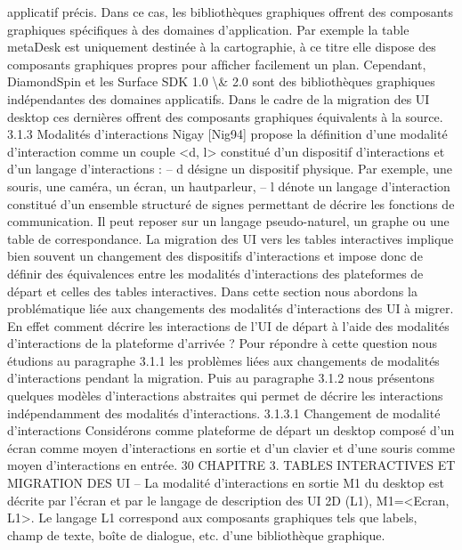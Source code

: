 \documentclass{article}
\begin{document}
applicatif pr\'{e}cis. Dans ce cas, les biblioth\`{e}ques graphiques offrent des composants graphiques sp\'{e}ciﬁques \`{a} des domaines d’application. Par exemple la table metaDesk est uniquement destin\'{e}e \`{a} la
cartographie, \`{a} ce titre elle dispose des composants graphiques propres pour afﬁcher facilement un
plan. Cependant, DiamondSpin et les Surface SDK 1.0 \textbackslash{}& 2.0 sont des biblioth\`{e}ques graphiques ind\'{e}pendantes des domaines applicatifs. Dans le cadre de la migration des UI desktop ces derni\`{e}res offrent
des composants graphiques \'{e}quivalents \`{a} la source.
3.1.3
Modalit\'{e}s d’interactions
Nigay [Nig94] propose la d\'{e}ﬁnition d’une modalit\'{e} d’interaction comme un couple <d, l> constitu\'{e} d’un dispositif d’interactions et d’un langage d’interactions :
– d d\'{e}signe un dispositif physique. Par exemple, une souris, une cam\'{e}ra, un \'{e}cran, un hautparleur,
– l d\'{e}note un langage d’interaction constitu\'{e} d’un ensemble structur\'{e} de signes permettant de d\'{e}crire les fonctions de communication. Il peut reposer sur un langage pseudo-naturel, un graphe
ou une table de correspondance.
La migration des UI vers les tables interactives implique bien souvent un changement des dispositifs d’interactions et impose donc de d\'{e}ﬁnir des \'{e}quivalences entre les modalit\'{e}s d’interactions des
plateformes de d\'{e}part et celles des tables interactives. Dans cette section nous abordons la probl\'{e}matique li\'{e}e aux changements des modalit\'{e}s d’interactions des UI \`{a} migrer. En effet comment d\'{e}crire les
interactions de l’UI de d\'{e}part \`{a} l’aide des modalit\'{e}s d’interactions de la plateforme d’arriv\'{e}e ? Pour
r\'{e}pondre \`{a} cette question nous \'{e}tudions au paragraphe 3.1.1 les probl\`{e}mes li\'{e}es aux changements de
modalit\'{e}s d’interactions pendant la migration. Puis au paragraphe 3.1.2 nous pr\'{e}sentons quelques mod\`{e}les d’interactions abstraites qui permet de d\'{e}crire les interactions ind\'{e}pendamment des modalit\'{e}s
d’interactions.
3.1.3.1
Changement de modalit\'{e} d’interactions
Consid\'{e}rons comme plateforme de d\'{e}part un desktop compos\'{e} d’un \'{e}cran comme moyen d’interactions en sortie et d’un clavier et d’une souris comme moyen d’interactions en entr\'{e}e.
30
CHAPITRE 3. TABLES INTERACTIVES ET MIGRATION DES UI
– La modalit\'{e} d’interactions en sortie M1 du desktop est d\'{e}crite par l’\'{e}cran et par le langage
de description des UI 2D (L1), M1=<Ecran, L1>. Le langage L1 correspond aux composants
graphiques tels que labels, champ de texte, bo\^{i}te de dialogue, etc. d’une biblioth\`{e}que graphique.
\end{document}
